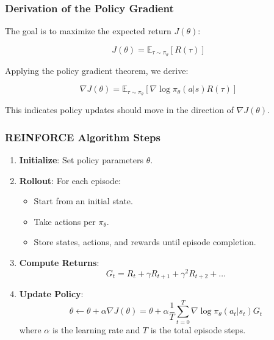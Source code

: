 \documentclass[aspectratio=169]{beamer}
\begin{document}
\begin{frame}[fragile]
    \frametitle{Derivation of the Policy Gradient}
    The goal is to maximize the expected return \( J(\theta) \):

    \begin{equation}
        J(\theta) = \mathbb{E}_{\tau \sim \pi_\theta} \left[ R(\tau) \right]
    \end{equation}

    Applying the policy gradient theorem, we derive:
    
    \begin{equation}
        \nabla J(\theta) = \mathbb{E}_{\tau \sim \pi_\theta} \left[ \nabla \log \pi_\theta(a|s) R(\tau) \right]
    \end{equation}

    This indicates policy updates should move in the direction of \( \nabla J(\theta) \).
\end{frame}

\begin{frame}[fragile]
    \frametitle{REINFORCE Algorithm Steps}
    \begin{enumerate}
        \item \textbf{Initialize}: Set policy parameters \( \theta \).
        \item \textbf{Rollout}: For each episode:
        \begin{itemize}
            \item Start from an initial state.
            \item Take actions per \( \pi_\theta \).
            \item Store states, actions, and rewards until episode completion.
        \end{itemize}
        \item \textbf{Compute Returns}:
        \begin{equation}
            G_t = R_t + \gamma R_{t+1} + \gamma^2 R_{t+2} + \ldots
        \end{equation}
        \item \textbf{Update Policy}:
        \begin{equation}
            \theta \leftarrow \theta + \alpha \nabla J(\theta) = \theta + \alpha \frac{1}{T} \sum_{t=0}^{T} \nabla \log \pi_\theta(a_t|s_t) G_t
        \end{equation}
        where \( \alpha \) is the learning rate and \( T \) is the total episode steps.
    \end{enumerate}
\end{frame}
\end{document}
